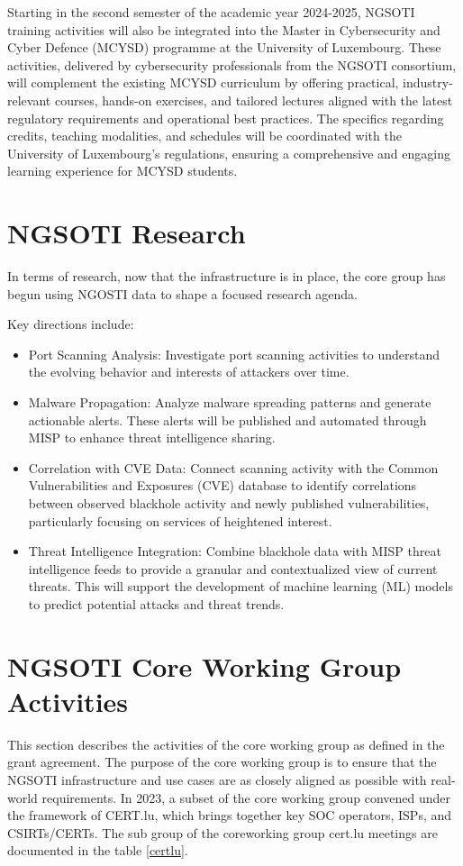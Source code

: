Starting in the second semester of the academic year 2024-2025, NGSOTI
training activities will also be integrated into the Master in
Cybersecurity and Cyber Defence (MCYSD) programme at the University of
Luxembourg. These activities, delivered by cybersecurity professionals
from the NGSOTI consortium, will complement the existing MCYSD
curriculum by offering practical, industry-relevant courses, hands-on
exercises, and tailored lectures aligned with the latest regulatory
requirements and operational best practices. The specifics regarding
credits, teaching modalities, and schedules will be coordinated with the
University of Luxembourg's regulations, ensuring a comprehensive and
engaging learning experience for MCYSD students.


\chapter{NGSOTI Research}
In terms of research, now that the infrastructure is in place, the core group
has begun using NGOSTI data to shape a focused research agenda.

Key directions include:

\begin{itemize}
 \item Port Scanning Analysis: Investigate port scanning activities to
 understand the evolving behavior and interests of attackers over time.
 \item Malware Propagation: Analyze malware spreading patterns and
 generate actionable alerts. These alerts will be published and automated
 through MISP to enhance threat intelligence sharing.
 \item Correlation with CVE Data: Connect scanning activity with the
 Common Vulnerabilities and Exposures (CVE) database to identify
 correlations between observed blackhole activity and newly published
 vulnerabilities, particularly focusing on services of heightened interest.
 \item Threat Intelligence Integration: Combine blackhole data with MISP
 threat intelligence feeds to provide a granular and contextualized view
 of current threats. This will support the development of machine
 learning (ML) models to predict potential attacks and threat trends.
 \end{itemize}


\chapter{NGSOTI Core Working Group Activities}
This section describes the activities of the core working group as defined in the grant agreement. The purpose of the core working group is to ensure that the NGSOTI infrastructure and use cases are as closely aligned as possible with real-world requirements. In 2023, a subset of the core working group convened under the framework of CERT.lu, which brings together key SOC operators, ISPs, and CSIRTs/CERTs.
The sub group of the coreworking group cert.lu meetings are documented in the table \ref{certlu}.

